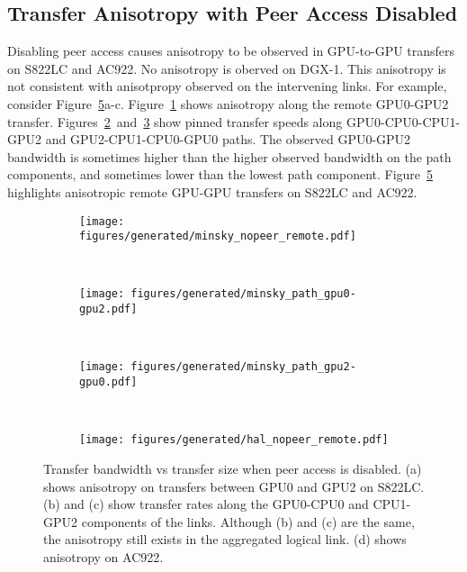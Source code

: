 \subsection{Transfer Anisotropy with Peer Access Disabled}
\label{sec:explicit-peer-direction}

Disabling peer access causes anisotropy to be observed in GPU-to-GPU transfers on S822LC and AC922.
No anisotropy is oberved on DGX-1.
This anisotropy is not consistent with anisotpropy observed on the intervening links.
For example, consider Figure~\ref{fig:explicit-peer-anisotropy}a-c.
Figure~\ref{fig:minsky-explicit-nopeer-remote} shows anisotropy along the remote GPU0-GPU2 transfer.
Figures~\ref{fig:minsky-explicit-path-gpu0-gpu2}~and~\ref{fig:minsky-explicit-path-gpu2-gpu0} show pinned transfer speeds along GPU0-CPU0-CPU1-GPU2 and GPU2-CPU1-CPU0-GPU0 paths.
The observed GPU0-GPU2 bandwidth is sometimes higher than the higher observed bandwidth on the path components, and sometimes lower than the lowest path component.
Figure~\ref{fig:explicit-peer-anisotropy} highlights anisotropic remote GPU-GPU transfers on S822LC and AC922.

\begin{figure}[ht]
    \centering
    \begin{subfigure}[b]{0.3\textwidth}
        \texttt{[image: figures/generated/minsky\_nopeer\_remote.pdf]}
        \caption{}
        \label{fig:minsky-explicit-nopeer-remote}
    \end{subfigure}
    ~
    \begin{subfigure}[b]{0.3\textwidth}
        \texttt{[image: figures/generated/minsky\_path\_gpu0-gpu2.pdf]}
        \caption{}
        \label{fig:minsky-explicit-path-gpu0-gpu2}
    \end{subfigure}
    ~
    \begin{subfigure}[b]{0.3\textwidth}
        \texttt{[image: figures/generated/minsky\_path\_gpu2-gpu0.pdf]}
        \caption{}
        \label{fig:minsky-explicit-path-gpu2-gpu0}
    \end{subfigure}
    \\
    \begin{subfigure}[b]{0.3\textwidth}
        \texttt{[image: figures/generated/hal\_nopeer\_remote.pdf]}
        \caption{}
        \label{fig:explicit-ac922-nopeer-remote}
    \end{subfigure}
    \caption[]{
        Transfer bandwidth vs transfer size when peer access is disabled.
        (a) shows anisotropy on transfers between GPU0 and GPU2 on S822LC.
        (b) and (c) show transfer rates along the GPU0-CPU0 and CPU1-GPU2 components of the links.
        Although (b) and (c) are the same, the anisotropy still exists in the aggregated logical link.
        (d) shows anisotropy on AC922.
    }
    \label{fig:explicit-peer-anisotropy}
\end{figure}

